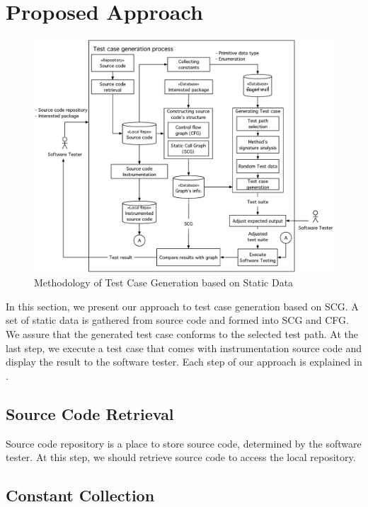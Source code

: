 \section{Proposed Approach}

\begin{figure}[ht!]
    \centering
    \includegraphics[width=\linewidth]{figures/Methodology}
    \caption{Methodology of Test Case Generation based on Static Data}
    \label{fig:methodology}
\end{figure}

In this section, we present our approach to test case generation 
based on SCG. A set of static data is gathered from source code 
and formed into SCG and CFG. We assure that the generated test case 
conforms to the selected test path. At the last step, we execute 
a test case that comes with instrumentation source code and display 
the result to the software tester. Each step of our approach 
is explained in .

\subsection{Source Code Retrieval}

Source code repository is a place to store source code, 
determined by the software tester. At this step, we should 
retrieve source code to access the local repository.

\subsection{Constant Collection}

